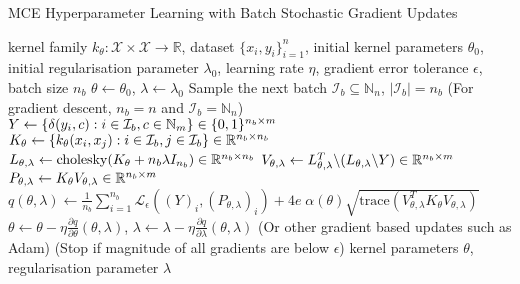 \documentclass[twoside]{article}
\begin{document}
		\begin{algorithm*}[tb]
			\caption{\gls{MCE} Hyperparameter Learning with Batch Stochastic Gradient Updates}
			\label{alg:multiclass_conditional_embedding_training}
			\begin{algorithmic}[1]
				 kernel family $k_{\theta} : \mathcal{X} \times \mathcal{X} \to \mathbb{R}$, dataset $\{x_{i}, y_{i}\}_{i = 1}^{n}$, initial kernel parameters $\theta_{0}$, initial regularisation parameter $\lambda_{0}$, learning rate $\eta$, gradient error tolerance $\epsilon$, batch size $n_{b}$
				\STATE $\theta \leftarrow \theta_{0}$, $\lambda \leftarrow \lambda_{0}$
				\REPEAT
				\STATE Sample the next batch $\mathcal{I}_{b} \subseteq \mathbb{N}_{n}$, $| \mathcal{I}_{b} | = n_{b}$ \hspace{\fill} (For gradient descent, $n_{b} = n$ and $\mathcal{I}_{b} = \mathbb{N}_{n}$)
				\STATE $Y \leftarrow \{\delta(y_{i}, c) : i \in \mathcal{I}_{b}, c \in \mathbb{N}_{m}\} \hspace{\fill} \in \{0, 1\}^{n_{b} \times m}$
				\STATE $K_{\theta} \leftarrow \{k_{\theta}(x_{i}, x_{j}) : i \in \mathcal{I}_{b}, j \in \mathcal{I}_{b}\} \hspace{\fill} \in \mathbb{R}^{n_{b} \times n_{b}}$
				\STATE $L_{\theta, \lambda} \leftarrow \mathrm{cholesky}(K_{\theta} + n_{b} \lambda I_{n_{b}}) \hspace{\fill} \in \mathbb{R}^{n_{b} \times n_{b}}$
				\STATE $V_{\theta, \lambda} \leftarrow L_{\theta, \lambda}^{T} \backslash (L_{\theta, \lambda} \backslash Y) \hspace{\fill} \in \mathbb{R}^{n_{b} \times m}$
				\STATE $P_{\theta, \lambda} \leftarrow K_{\theta} V_{\theta, \lambda} \hspace{\fill} \in \mathbb{R}^{n_{b} \times m}$
				\STATE $q(\theta, \lambda) \leftarrow \frac{1}{n_{b}} \sum_{i = 1}^{n_{b}} \mathcal{L}_{\epsilon}((Y)_{i}, (P_{\theta, \lambda})_{i}) + 4 e \; \alpha(\theta) \sqrt{\mathrm{trace}(V_{\theta, \lambda}^{T} K_{\theta} V_{\theta, \lambda})}$
				\STATE $\theta \leftarrow \theta - \eta \frac{\partial q}{\partial \theta}(\theta, \lambda)$, $\lambda \leftarrow \lambda - \eta \frac{\partial q}{\partial \lambda}(\theta, \lambda)$ \hspace{\fill} (Or other gradient based updates such as Adam)
				 \hspace{\fill} (Stop if magnitude of all gradients are below $\epsilon$)
				 kernel parameters $\theta$, regularisation parameter $\lambda$
			\end{algorithmic}
		\end{algorithm*}
		
\end{document}
